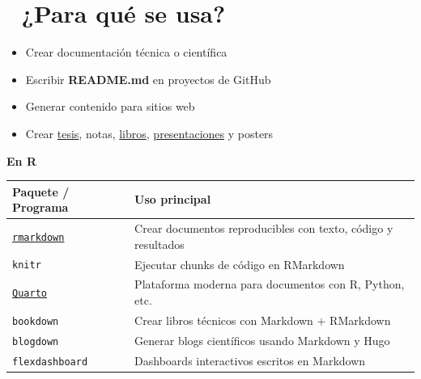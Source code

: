 \documentclass[
  spanish,
  12pt,
  letterpaper,
  DIV=11,
  numbers=noendperiod]{scrreprt}
\newcounter{none} %
\providecommand{\tightlist}{%
  \setlength{\itemsep}{0pt}\setlength{\parskip}{0pt}}
\begin{document}
\section{🧠 ¿Para qué se usa?}\label{para-quuxe9-se-usa}

\begin{itemize}
\tightlist
\item
  Crear documentación técnica o científica
\item
  Escribir \textbf{README.md} en proyectos de GitHub
\item
  Generar contenido para sitios web
\item
  Crear
  \href{https://quarto.org/docs/get-started/hello/rstudio.html}{tesis},
  notas, \href{https://bookdown.org/yihui/rmarkdown-cookbook/}{libros},
  \href{https://bookdown.org/yihui/rmarkdown/xaringan.html}{presentaciones}
  y posters
\end{itemize}

\textbf{En R}

{\def\LTcaptype{none} %
\begin{longtable}[]{@{}
  >{\raggedright\arraybackslash}p{}
  >{\raggedright\arraybackslash}p{}@{}}
\toprule\noalign{}
\begin{minipage}[b]{\linewidth}\raggedright
Paquete / Programa
\end{minipage} & \begin{minipage}[b]{\linewidth}\raggedright
Uso principal
\end{minipage} \\
\midrule\noalign{}
\endhead
\bottomrule\noalign{}
\endlastfoot
\href{https://github.com/EveliaCoss/RmarkdownGraphs_notes}{\texttt{rmarkdown}}
& Crear documentos reproducibles con texto, código y resultados \\
\texttt{knitr} & Ejecutar chunks de código en RMarkdown \\
\href{https://quarto.org/docs/get-started/hello/vscode.html}{\texttt{Quarto}}
& Plataforma moderna para documentos con R, Python, etc. \\
\texttt{bookdown} & Crear libros técnicos con Markdown + RMarkdown \\
\texttt{blogdown} & Generar blogs científicos usando Markdown y Hugo \\
\texttt{flexdashboard} & Dashboards interactivos escritos en Markdown \\
\end{longtable}
}
\end{document}
